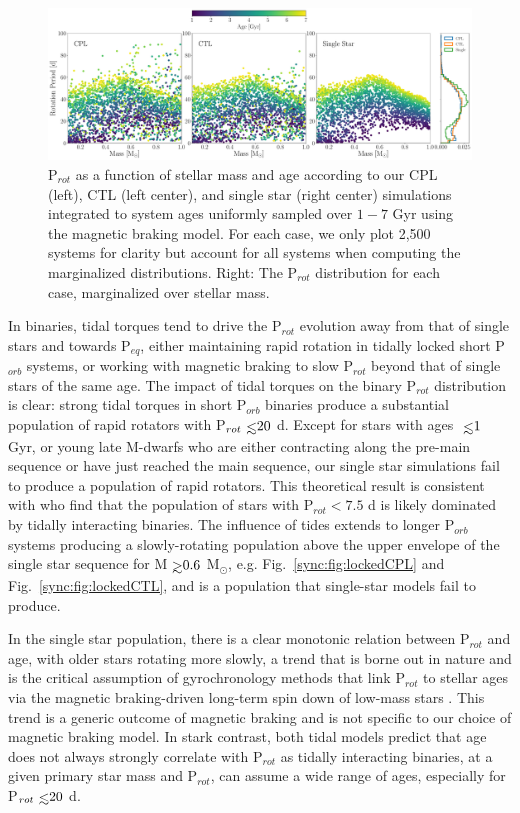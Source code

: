 \begin{figure}
	\includegraphics[width=\columnwidth]{protDist.pdf}
   \caption{P$_{rot}$ as a function of stellar mass and age according to our CPL (left), CTL (left center), and single star (right center) simulations integrated to system ages uniformly sampled over $1-7$ Gyr using the \citet{Matt2015} magnetic braking model. For each case, we only plot 2,500 systems for clarity but account for all systems when computing the marginalized distributions. Right: The P$_{rot}$ distribution for each case, marginalized over stellar mass.}%
    \label{sync:fig:protDist}%
\end{figure}

In binaries, tidal torques tend to drive the P$_{rot}$ evolution away from that of single stars and towards P$_{eq}$, either maintaining rapid rotation in tidally locked short P$_{orb}$ systems, or working with magnetic braking to slow P$_{rot}$ beyond that of single stars of the same age. The impact of tidal torques on the binary P$_{rot}$ distribution is clear: strong tidal torques in short P$_{orb}$ binaries produce a substantial population of rapid rotators with P$_{rot} \lsim 20$ d. Except for stars with ages $\lsim 1$ Gyr, or young late M-dwarfs who are either contracting along the pre-main sequence or have just reached the main sequence, our single star simulations fail to produce a population of rapid rotators. This theoretical result is consistent with \citet{Simonian2018} who find that the population of \kepler stars with P$_{rot} < 7.5$ d is likely dominated by tidally interacting binaries.  The influence of tides extends to longer P$_{orb}$ systems producing a slowly-rotating population above the upper envelope of the single star sequence for M$ \gsim 0.6$ M$_{\odot}$, e.g. Fig.~\ref{sync:fig:lockedCPL} and Fig.~\ref{sync:fig:lockedCTL}, and is a population that single-star models fail to produce. 

In the single star population, there is a clear monotonic relation between P$_{rot}$ and age, with older stars rotating more slowly, a trend that is borne out in nature and is the critical assumption of gyrochronology methods that link P$_{rot}$ to stellar ages via the magnetic braking-driven long-term spin down of low-mass stars \citep[e.g.][]{Skumanich1972,Barnes2003,Barnes2007,Mamajek2008,Barnes2010,Meibom2015}. This trend is a generic outcome of magnetic braking and is not specific to our choice of magnetic braking model. In stark contrast, both tidal models predict that age does not always strongly correlate with P$_{rot}$ as tidally interacting binaries, at a given primary star mass and P$_{rot}$, can assume a wide range of ages, especially for P$_{rot} \lsim 20$ d. 

